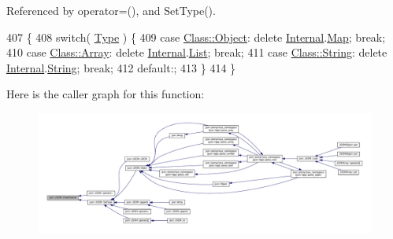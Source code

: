 Referenced by operator=(), and Set\+Type().


\begin{DoxyCode}
407                            \{
408         \textcolor{keywordflow}{switch}( \mbox{\hyperlink{classjson_1_1_j_s_o_n_a3fa6923afa41bdfe38077fbc0079aaf5}{Type}} ) \{
409           \textcolor{keywordflow}{case} \mbox{\hyperlink{classjson_1_1_j_s_o_n_a762f55df6d407c1af61607ed516ffe07a497031794414a552435f90151ac3b54b}{Class::Object}}: \textcolor{keyword}{delete} \mbox{\hyperlink{classjson_1_1_j_s_o_n_a1e2a064794c3d55c8bb8887fc5734947}{Internal}}.\mbox{\hyperlink{unionjson_1_1_j_s_o_n_1_1_backing_data_ab2e19b00745b37d2add157ff3a35c431}{Map}};    \textcolor{keywordflow}{break};
410           \textcolor{keywordflow}{case} \mbox{\hyperlink{classjson_1_1_j_s_o_n_a762f55df6d407c1af61607ed516ffe07a4410ec34d9e6c1a68100ca0ce033fb17}{Class::Array}}:  \textcolor{keyword}{delete} \mbox{\hyperlink{classjson_1_1_j_s_o_n_a1e2a064794c3d55c8bb8887fc5734947}{Internal}}.\mbox{\hyperlink{unionjson_1_1_j_s_o_n_1_1_backing_data_ab85f5e7ad21f9f7a5407ab73128a3ebc}{List}};   \textcolor{keywordflow}{break};
411           \textcolor{keywordflow}{case} \mbox{\hyperlink{classjson_1_1_j_s_o_n_a762f55df6d407c1af61607ed516ffe07a27118326006d3829667a400ad23d5d98}{Class::String}}: \textcolor{keyword}{delete} \mbox{\hyperlink{classjson_1_1_j_s_o_n_a1e2a064794c3d55c8bb8887fc5734947}{Internal}}.\mbox{\hyperlink{unionjson_1_1_j_s_o_n_1_1_backing_data_a883c18d113d2e55767a9530f06a9c772}{String}}; \textcolor{keywordflow}{break};
412           \textcolor{keywordflow}{default}:;
413         \}
414       \}
\end{DoxyCode}
Here is the caller graph for this function\+:
\nopagebreak
\begin{figure}[H]
\begin{center}
\leavevmode
\includegraphics[width=350pt]{classjson_1_1_j_s_o_n_afefdc8c18c2c40575c2c8463fbd78c67_icgraph}
\end{center}
\end{figure}
\mbox{\label{classjson_1_1_j_s_o_n_acb99af0df2045a504f6bbc08bf5c4990}} 
